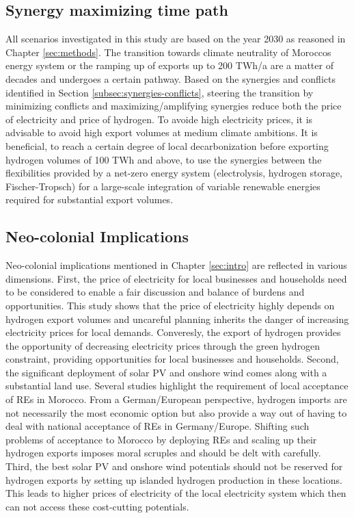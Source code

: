 \subsection{Synergy maximizing time path}
\label{subsec:timepath}
All scenarios investigated in this study are based on the year 2030 as reasoned in Chapter \ref{sec:methods}. The transition towards climate neutrality of Moroccos energy system or the ramping up of exports up to 200 TWh/a are a matter of decades and undergoes a certain pathway. Based on the synergies and conflicts identified in Section \ref{subsec:synergies-conflicts}, steering the transition by minimizing conflicts and maximizing/amplifying synergies reduce both the price of electricity and price of hydrogen. To avoide high electricity prices, it is advisable to avoid high export volumes at medium climate ambitions. It is beneficial, to reach a certain degree of local decarbonization before exporting hydrogen volumes of 100 TWh and above, to use the synergies between the flexibilities provided by a net-zero energy system (electrolysis, hydrogen storage, Fischer-Tropsch) for a large-scale integration of variable renewable energies required for substantial export volumes.


\subsection{Neo-colonial Implications}
\label{subsec:neocolonial}
Neo-colonial implications mentioned in Chapter \ref{sec:intro} are reflected in various dimensions. First, the price of electricity for local businesses and households need to be considered to enable a fair discussion and balance of burdens and opportunities. This study shows that the price of electricity highly depends on hydrogen export volumes and uncareful planning inherits the danger of increasing electricity prices for local demands. Converesly, the export of hydrogen provides the opportunity of decreasing electricity prices through the green hydrogen constraint, providing opportunities for local businesses and households.
Second, the significant deployment of solar PV and onshore wind comes along with a substantial land use. Several studies \cite{Terrapon-Pfaff2019, Hanger2016} highlight the requirement of local acceptance of REs in Morocco. From a German/European perspective, hydrogen imports are not necessarily the most economic option but also provide a way out of having to deal with national acceptance of REs in Germany/Europe. Shifting such problems of acceptance to Morocco by deploying REs and scaling up their hydrogen exports imposes moral scruples and should be delt with carefully. %
Third, the best solar PV and onshore wind potentials should not be reserved for hydrogen exports by setting up islanded hydrogen production in these locations. This leads to higher prices of electricity of the local electricity system which then can not access these cost-cutting potentials.

